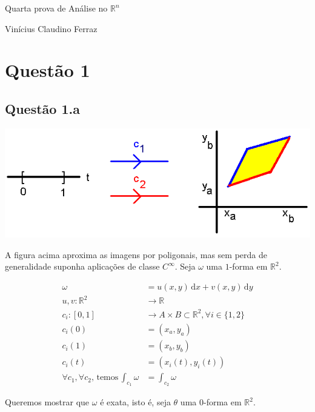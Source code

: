 \documentclass[12pt,a4paper]{article}
\date{}
\begin{document}
	\Large

	\begin{center}
		Quarta prova de An\'alise no $\mathbb{R}^n$

		Vin\'icius Claudino Ferraz
	\end{center}

	\normalsize

	\section{Quest\~ao 1}
		\begin{flushright}
		\end{flushright}

	\subsection{Quest\~ao 1.a}
		\begin{center}
		\includegraphics[scale=.5]{questao1}
		\end{center}

		A figura acima aproxima as imagens por poligonais, mas sem perda de generalidade suponha aplica\c{c}\~oes de classe $C^\infty$. Seja $\omega$ uma $1$-forma em $\mathbb{R}^2$.

		\begin{align}
			\omega &= u(x,y) \,\mathrm{d}x + v(x,y) \,\mathrm{d}y \\
			u, v : \mathbb{R}^2 &\rightarrow \mathbb{R} \\
			c_i : [0, 1] &\rightarrow A \times B \subset \mathbb{R}^2, \forall i \in \{1, 2\} \\
			c_i(0) &= (x_a, y_a) \\
			c_i(1) &= (x_b, y_b) \\
			c_i(t) &= (x_i(t), y_i(t)) \\
			\forall c_1, \forall c_2, \,\mathrm{temos}\, \int_{c_1} \omega &= \int_{c_2} \omega \label{Sete}
		\end{align}

		Queremos mostrar que $\omega$ \'e exata, isto \'e, seja $\theta$ uma $0$-forma em $\mathbb{R}^2$.
\end{document}
